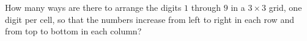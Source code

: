 How many ways are there to arrange the digits $1$ through $9$ in a $3\times3$ grid, one digit per cell, so that the numbers increase from left to right in each row and from top to bottom in each column?
